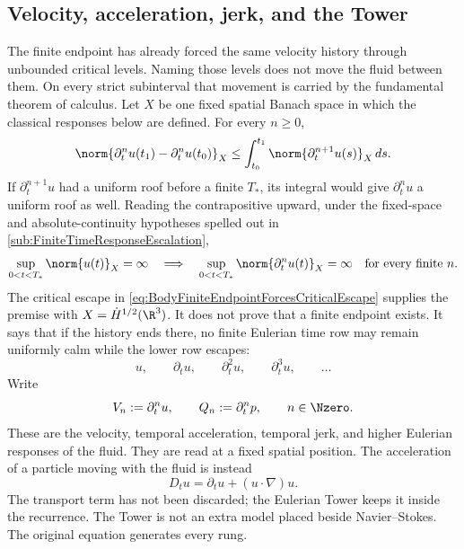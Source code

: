\subsection{Velocity, acceleration, jerk, and the Tower}\label{sub:BodyFiniteTimeResponseEscalation}

The finite endpoint has already forced the same velocity history through
unbounded critical levels.  Naming those levels does not move the fluid
between them.  On every strict subinterval that movement is carried by the
fundamental theorem of calculus.  Let \(X\) be one fixed spatial Banach space
in which the classical responses below are defined.  For every \(n\geq0\),
\begin{equation}\label{eq:BodyResponseIncrement}
  \norm{\partial_t^nu(t_1)-\partial_t^nu(t_0)}_X
  \leq
  \int_{t_0}^{t_1}\norm{\partial_t^{n+1}u(s)}_X\,ds.
\end{equation}
If \(\partial_t^{n+1}u\) had a uniform roof before a finite \(T_*\), its
integral would give \(\partial_t^nu\) a uniform roof as well.  Reading the
contrapositive upward, under the fixed-space and absolute-continuity hypotheses
spelled out in \cref{sub:FiniteTimeResponseEscalation},
\begin{equation}\label{eq:BodyConditionalTemporalEscape}
  \sup_{0<t<T_*}\norm{u(t)}_X=\infty
  \quad\Longrightarrow\quad
  \sup_{0<t<T_*}\norm{\partial_t^nu(t)}_X=\infty
  \quad\text{for every finite }n.
\end{equation}
The critical escape in \eqref{eq:BodyFiniteEndpointForcesCriticalEscape}
supplies the premise with \(X=\dot H^{1/2}(\R^3)\).  It does not prove that a
finite endpoint exists.  It says that if the history ends there, no finite
Eulerian time row may remain uniformly calm while the lower row escapes:
\[
  u,
  \qquad
  \partial_tu,
  \qquad
  \partial_t^2u,
  \qquad
  \partial_t^3u,
  \qquad
  \ldots
\]
Write
\begin{equation}\label{eq:TemporalTowerDefinitionBody}
  V_n:=\partial_t^nu,
  \qquad
  Q_n:=\partial_t^np,
  \qquad n\in\Nzero.
\end{equation}
These are the velocity, temporal acceleration, temporal jerk, and higher
Eulerian responses of the fluid.  They are read at a fixed spatial position.
The acceleration of a particle moving with the fluid is instead
\[
  D_tu=\partial_tu+(u\cdot\nabla)u.
\]
The transport term has not been discarded; the Eulerian Tower keeps it inside
the recurrence.  The Tower is not an extra model placed beside Navier--Stokes.
The original equation generates every rung.

